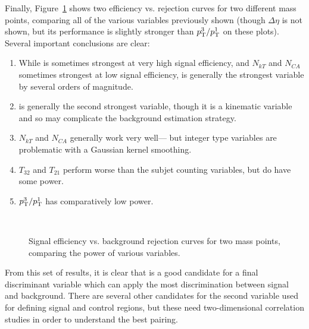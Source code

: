 
Finally, Figure~\ref{fig:search:search:optimization:All} shows two efficiency vs. rejection curves for two different mass points, comparing all of the various variables previously shown (though $\Delta \eta$ is not shown, but its performance is slightly stronger than $p_{\text{T}}^3/p_{\text{T}}^1$ on these plots). Several important conclusions are clear:

\begin{enumerate}
\item While \Ht is sometimes strongest at very high signal efficiency, and $N_{kT}$ and $N_{CA}$ sometimes strongest at low signal efficiency, \MJ is generally the strongest variable by several orders of magnitude.
\item \Ht is generally the second strongest variable, though it is a kinematic variable and so may complicate the background estimation strategy.
\item $N_{kT}$ and $N_{CA}$ generally work very well--- but integer type variables are problematic with a Gaussian kernel smoothing.
\item $T_{32}$ and $T_{21}$ perform worse than the subjet counting variables, but do have some power.
\item $p_{\text{T}}^3/p_{\text{T}}^1$ has comparatively low power.
\end{enumerate}


\begin{figure}
\centering
{}\\
\caption{Signal efficiency vs. background rejection curves for two mass points, comparing the power of various variables.}
\label{fig:search:search:optimization:All}
\end{figure}


From this set of results, it is clear that \MJ is a good candidate for a final discriminant variable which can apply the most discrimination between signal and background. There are several other candidates for the second variable used for defining signal and control regions, but these need two-dimensional correlation studies in order to understand the best pairing.


